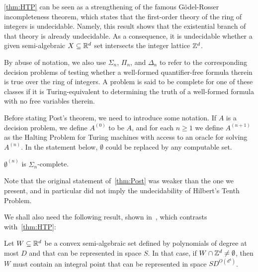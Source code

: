 \cref{thm:HTP} can be seen as a strengthening of the famous G\"{o}del-Rosser incompleteness theorem, which states that the first-order theory of the ring of integers is undecidable. Namely, this result shows that the existential branch of that theory is already undecidable. As a consequence, it is undecidable whether a given semi-algebraic $X \subseteq \mathbb{R}^{d}$ set intersects the integer lattice $\mathbb{Z}^{d}$.

By abuse of notation, we also use $\Sigma_{n}$, $\Pi_{n}$, and $\Delta_{n}$ to refer to the corresponding decision problems of testing whether a well-formed quantifier-free formula therein is true over the ring of integers. A problem is said to be complete for one of these classes if it is Turing-equivalent to determining the truth of a well-formed formula with no free variables therein.

Before stating Post's theorem, we need to introduce some notation. If $A$ is a decision problem, we define $A^{(0)}$ to be $A$, and for each $n \geq 1$ we define $A^{(n+1)}$ as the Halting Problem for Turing machines with access to an oracle for solving $A^{(n)}$. In the statement below, $\emptyset$ could be replaced by any computable set.

\begin{theorem}
\label{thm:Post}
$\emptyset^{(n)}$ is $\Sigma_{n}$-complete.
\end{theorem}

Note that the original statement of~\cref{thm:Post} was weaker than the one we present, and in particular did not imply the undecidability of Hilbert's Tenth Problem.

We shall also need the following result, shown in~\cite{KhachiyanP97}, which contrasts with~\cref{thm:HTP}:
\begin{theorem}
\label{thm:kp}
Let $W\subseteq\mathbb{R}^{d}$ be a convex semi-algebraic set defined by
polynomials of degree at most $D$ and that can be represented in space
$S$. In that case, if $W\cap\mathbb{Z}^{d}\neq\emptyset$, then $W$ must
contain an integral point that can be represented in space
$SD^{O(d^4)}$.
\end{theorem}
